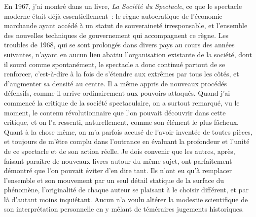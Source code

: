 \documentclass[french,twoside]{book} %
\def\mednobreak{\ifdim\lastskip<\medskipamount
  \removelastskip\nopagebreak\medskip\fi}
\newcommand{\labelblock}[1]{\medbreak{\noindent\color{rubric}\bfseries #1}\par\mednobreak}
\begin{document}
\labelblock{II}

\noindent En 1967, j’ai montré dans un livre, \emph{La Société du Spectacle}, ce que le spectacle moderne était déjà essentiellement : le règne autocratique de l’économie marchande ayant accédé à un statut de souveraineté irresponsable, et l’ensemble des nouvelles techniques de gouvernement qui accompagnent ce règne. Les troubles de 1968, qui se sont prolongés dans divers pays au cours des années suivantes, n’ayant en aucun lieu abattu l’organisation existante de la société, dont il sourd comme spontanément, le spectacle a donc continué partout de se renforcer, c’est-à-dire à la fois de s’étendre aux extrêmes par tous les côtés, et d’augmenter sa densité au centre. Il a même appris de nouveaux procédés défensifs, comme il arrive ordinairement aux pouvoirs attaqués. Quand j’ai commencé la critique de la société spectaculaire, on a surtout remarqué, vu le moment, le contenu révolutionnaire que l’on pouvait découvrir dans cette critique, et on l’a ressenti, naturellement, comme son élément le plus fâcheux. Quant à la chose même, on m’a parfois accusé de l’avoir inventée de toutes pièces, et toujours de m’être complu dans l’outrance en évaluant la profondeur et l’unité de ce spectacle et de son action réelle. Je dois convenir que les autres, après, faisant paraître de nouveaux livres autour du même sujet, ont parfaitement démontré que l’on pouvait éviter d’en dire tant. Ils n’ont eu qu’à remplacer l’ensemble et son mouvement par un seul détail statique de la surface du phénomène, l’originalité de chaque auteur se plaisant à le choisir différent, et par là d’autant moins inquiétant. Aucun n’a voulu altérer la modestie scientifique de son interprétation personnelle en y mêlant de téméraires jugements historiques.\par
\end{document}
